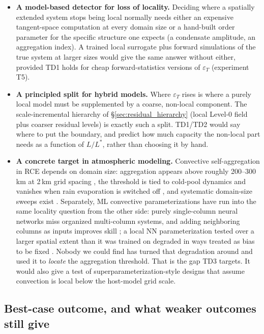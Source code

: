 \documentclass[11pt]{article}
\begin{document}
\begin{itemize}[nosep]
\item \textbf{A model-based detector for loss of locality.} Deciding
  where a spatially extended system stops being local normally needs
  either an expensive tangent-space computation at every domain size or
  a hand-built order parameter for the specific structure one expects
  (a condensate amplitude, an aggregation index). A trained local
  surrogate plus forward simulations of the true system at larger sizes
  would give the same answer without either, provided TD1 holds for
  cheap forward-statistics versions of $\varepsilon_T$ (experiment T5).
\item \textbf{A principled split for hybrid models.} Where
  $\varepsilon_T$ rises is where a purely local model must be
  supplemented by a coarse, non-local component. The scale-incremental
  hierarchy of \S\ref{sec:residual_hierarchy} (local Level-0 field plus
  coarser residual levels) is exactly such a split. TD1/TD2 would say
  where to put the boundary, and predict how much capacity the non-local
  part needs as a function of $L/L^*$, rather than choosing it by hand.
\item \textbf{A concrete target in atmospheric modeling.} Convective
  self-aggregation in RCE depends on domain size: aggregation appears
  above roughly 200--300\,km at 2\,km grid spacing \cite{mullerheld2012},
  the threshold is tied to cold-pool dynamics and vanishes when rain
  evaporation is switched off \cite{jeevanjeeromps2013}, and systematic
  domain-size sweeps exist \cite{patriziorandall2019,wing2020rcemip}.
  Separately, ML convective parameterizations have run into the same
  locality question from the other side: purely single-column neural
  networks miss organized multi-column systems, and adding neighboring
  columns as inputs improves skill \cite{wangyuvalogorman2022}; a local
  NN parameterization tested over a larger spatial extent than it was
  trained on degraded in ways treated as bias to be fixed
  \cite{brenowitzbretherton2019}. Nobody we could find has turned that
  degradation around and used it to \emph{locate} the aggregation
  threshold. That is the gap TD3 targets. It would also give a test of
  superparameterization-style designs that assume convection is local
  below the host-model grid scale.
\end{itemize}

\subsection{Best-case outcome, and what weaker outcomes still give}
\label{sec:td_best_case}
\end{document}
